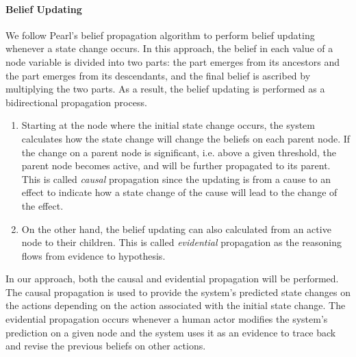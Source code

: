 \paragraph*{Belief Updating} %
\label{par:belief_updating}
We follow Pearl's belief propagation algorithm \cite{pearl1988probabilistic} to perform belief updating whenever a state change occurs. In this approach, the belief in each value of a node variable is divided into two parts: the part emerges from its ancestors and the part emerges from its descendants, and the final belief is ascribed by multiplying the two parts. As a result, the belief updating is performed as a bidirectional propagation process. 
\begin{enumerate}
	\item Starting at the node where the initial state change occurs, the system calculates how the state change will change the beliefs on each parent node. If the change on a parent node is significant, i.e. above a given threshold, the parent node becomes active, and will be further propagated to its parent. This is called \emph{causal} propagation since the updating is from a cause to an effect to indicate how a state change of the cause will lead to the change of the effect. 
	\item On the other hand, the belief updating can also calculated from an active node to their children. This is called \emph{evidential} propagation as the reasoning flows from evidence to hypothesis.
\end{enumerate}

In our approach, both the causal and evidential propagation will be performed. The causal propagation is used to provide the system's predicted state changes on the actions depending on the action associated with the initial state change. The evidential propagation occurs whenever a human actor modifies the system's prediction on a given node and the system uses it as an evidence to trace back and revise the previous beliefs on other actions.

